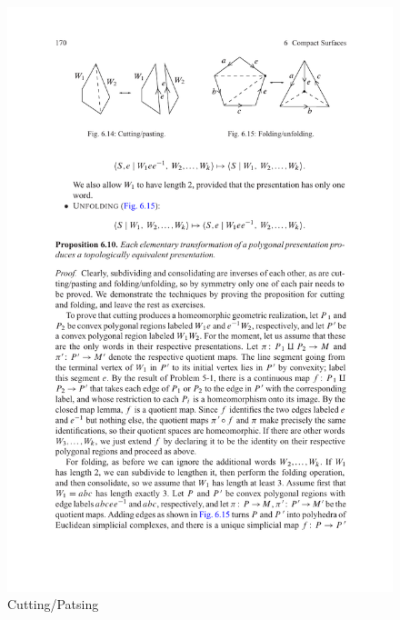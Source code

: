 \begin{figure}[htbp]
\centering
\begin{minipage}[t]{200pt}
\centering
\includegraphics{cutting.pdf}
\caption{Cutting/Patsing}
\end{minipage}
\hspace {20pt}
\begin{minipage}[t]{200pt}
\centering

\end{minipage}
\end{figure}
